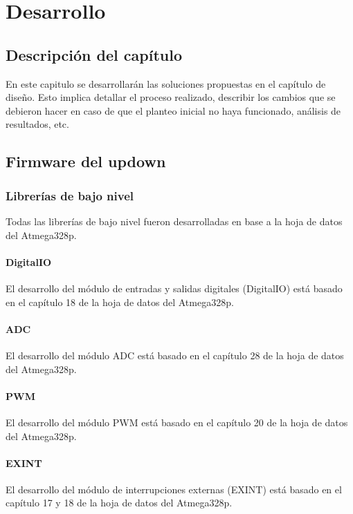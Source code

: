 \chapter{Desarrollo}
\thispagestyle{empty}

\section{Descripción del capítulo} \label{sec:\thesection}
En este capitulo se desarrollarán las soluciones propuestas en el capítulo de diseño. Esto implica detallar el proceso realizado, describir los cambios que se debieron hacer en caso de que el planteo inicial no haya funcionado, análisis de resultados, etc.

\section{Firmware del updown} \label{sec:\thesection}

\subsection{Librerías de bajo nivel}
Todas las librerías de bajo nivel fueron desarrolladas en base a la hoja de datos del Atmega328p.

\subsubsection{DigitalIO}
El desarrollo del módulo de entradas y salidas digitales (DigitalIO) está basado en el capítulo 18 de la hoja de datos del Atmega328p.
\subsubsection{ADC}
El desarrollo del módulo ADC está basado en el capítulo 28 de la hoja de datos del Atmega328p.

\subsubsection{PWM}
El desarrollo del módulo PWM está basado en el capítulo 20 de la hoja de datos del Atmega328p.

\subsubsection{EXINT}
El desarrollo del módulo de interrupciones externas (EXINT) está basado en el capítulo 17 y 18 de la hoja de datos del Atmega328p.

